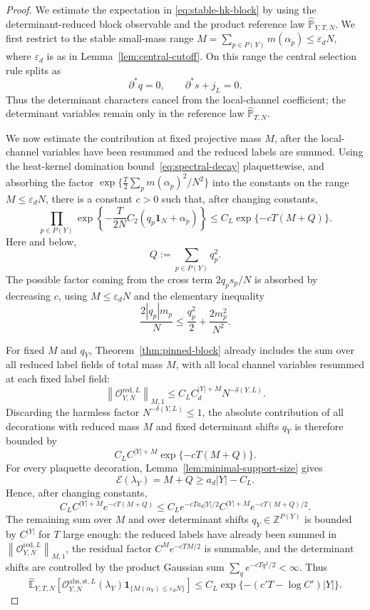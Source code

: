 \documentclass[10pt,a4paper]{amsart}
\newcommand\E{{\mathbb E}}
\newcommand\Pbb{{\mathbb{P}}}
\newcommand\Z{{\mathbb{Z}}}
\begin{document}
\begin{proof}
We estimate the expectation in \eqref{eq:stable-hk-block} by using the determinant-reduced block observable and the product reference law $\widehat\Pbb_{Y,T,N}$. We first restrict to the stable small-mass range $M=\sum_{p\in P(Y)}m(\alpha_p)\le \varepsilon_d N,$ where $\varepsilon_d$ is as in Lemma~\ref{lem:central-cutoff}.  On this range the central selection rule splits as
\[
\partial^*q=0,
\qquad
\partial^*s+j_L=0.
\]
Thus the determinant characters cancel from the local-channel coefficient; the determinant variables remain only in the reference law $\widehat\Pbb_{T,N}$.

We now estimate the contribution at fixed projective mass $M$, after the local-channel variables have been resummed and the reduced labels are summed.  Using the heat-kernel domination bound~\eqref{eq:spectral-decay} plaquettewise, and absorbing the factor $\exp\{\frac{T}{2}\sum_p m(\alpha_p)^2/N^2\}$ into the constants on the range $M\le\varepsilon_dN$, there is a constant $c>0$ such that, after changing constants,
\[
\prod_{p\in P(Y)}
\exp\left\{-\frac{T}{2N}C_2(q_p\mathbf 1_N+\alpha_p)\right\}
\le C_L\exp\{-cT(M+Q)\}.
\]
Here and below,
\[
Q:=\sum_{p\in P(Y)}q_p^2.
\]
The possible factor coming from the cross term $2q_ps_p/N$ is absorbed by decreasing $c$, using $M\le\varepsilon_dN$ and the elementary inequality
\[
\frac{2|q_p|m_p}{N}
\le \frac{q_p^2}{2}+\frac{2m_p^2}{N^2}.
\]

For fixed $M$ and $q_Y$, Theorem~\ref{thm:pinned-block} already includes the sum over all reduced label fields of total mass $M$, with all local channel variables resummed at each fixed label field:
\[
\left\|\mathcal O_{Y,N}^{\mathrm{red},L}\right\|_{M,1}
\le C_LC_d^{|Y|+M}N^{-\delta(Y,L)} .
\]
Discarding the harmless factor $N^{-\delta(Y,L)}\le1$, the absolute contribution of all decorations with reduced mass $M$ and fixed determinant shifts $q_Y$ is therefore bounded by
\[
C_L C^{|Y|+M}\exp\{-cT(M+Q)\} .
\]
For every plaquette decoration, Lemma~\ref{lem:minimal-support-size} gives
\[
\mathcal E(\lambda_Y)=M+Q\ge a_d|Y|-C_L.
\]
Hence, after changing constants,
\[
C_L C^{|Y|+M}e^{-cT(M+Q)}
\le
C_L e^{-cTa_d|Y|/2}
C^{|Y|+M}e^{-cT(M+Q)/2}.
\]
The remaining sum over $M$ and over determinant shifts $q_Y\in\Z^{P(Y)}$ is bounded by $C^{|Y|}$ for $T$ large enough: the reduced labels have already been summed in $\left\|\mathcal O_{Y,N}^{\mathrm{red},L}\right\|_{M,1}$, the residual factor $C^M e^{-cTM/2}$ is summable, and the determinant shifts are controlled by the product Gaussian sum $\sum_q e^{-cTq^2/2}<\infty$.  Thus
\[
\widehat\E_{Y,T,N}\left[
\mathcal O_{Y,N}^{\mathrm{abs},\mathrm{st},L}(\lambda_Y)
\mathbf 1_{\{M(\alpha_Y)\le\varepsilon_dN\}}
\right]
\le
C_L\exp\{-(c'T-\log C')|Y|\}.
\]


\end{proof}
\end{document}
